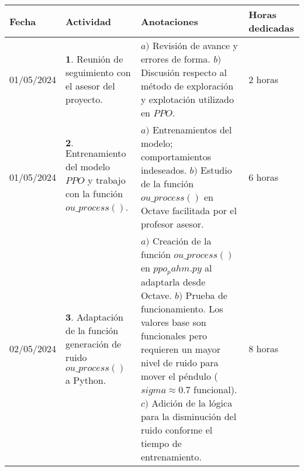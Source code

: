 \documentclass[12pt]{article}
\begin{document}
\begin{minipage}[h]{\textwidth}
	\centering
	\begin{tabularx}{\textwidth}{|p{2cm}|X|X|p{2cm}|} 
		\hline
		\rowcolor{encabezado}
		\textbf{Fecha} & 
		\textbf{Actividad} & 
		\textbf{Anotaciones} & 
		\textbf{Horas dedicadas} \\ \hline
	 	01/05/2024 & 
	 	$\mathbf{1}.$ Reunión de seguimiento con el asesor del proyecto. & 
	 	$a)$ Revisión de avance y errores de forma. \newline
	 	$b)$ Discusión respecto al método de exploración y explotación utilizado en $PPO$. \newline & 
	 	2 horas \\
	 	01/05/2024 & 
	 	$\mathbf{2}.$ Entrenamiento del modelo $PPO$ y trabajo con la función $ou\_process()$. & 
	 	$a)$ Entrenamientos del modelo; comportamientos indeseados. \newline
	 	$b)$ Estudio de la función $ou\_process()$ en Octave facilitada por el profesor asesor. \newline & 
	 	6 horas \\
		02/05/2024 & 
	 	$\mathbf{3}.$ Adaptación de la función generación de ruido $ou\_process()$ a Python. &
	 	$a)$ Creación de la función $ou\_process()$ en $ppo_pahm.py$ al adaptarla desde Octave. \newline
	 	$b)$ Prueba de funcionamiento. Los valores base son funcionales pero requieren un mayor nivel de ruido para mover el péndulo ($sigma\approx 0.7$ funcional). \newline
	 	$c)$ Adición de la lógica para la disminución del ruido conforme el tiempo de entrenamiento. \newline & 
	 	8 horas \\

	 	\hline
	\end{tabularx}
\end{minipage}	 	
	 	
\end{document}
